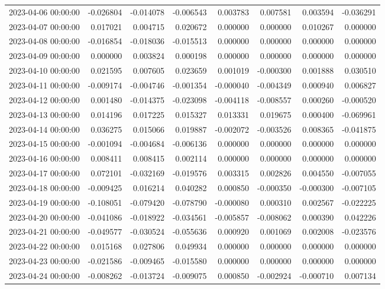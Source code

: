 \begin{tabular}{lrrrrrrr}
2023-04-06 00:00:00 & -0.026804 & -0.014078 & -0.006543 & 0.003783 & 0.007581 & 0.003594 & -0.036291 \\
2023-04-07 00:00:00 & 0.017021 & 0.004715 & 0.020672 & 0.000000 & 0.000000 & 0.010267 & 0.000000 \\
2023-04-08 00:00:00 & -0.016854 & -0.018036 & -0.015513 & 0.000000 & 0.000000 & 0.000000 & 0.000000 \\
2023-04-09 00:00:00 & 0.000000 & 0.003824 & 0.000198 & 0.000000 & 0.000000 & 0.000000 & 0.000000 \\
2023-04-10 00:00:00 & 0.021595 & 0.007605 & 0.023659 & 0.001019 & -0.000300 & 0.001888 & 0.030510 \\
2023-04-11 00:00:00 & -0.009174 & -0.004746 & -0.001354 & -0.000040 & -0.004349 & 0.000940 & 0.006827 \\
2023-04-12 00:00:00 & 0.001480 & -0.014375 & -0.023098 & -0.004118 & -0.008557 & 0.000260 & -0.000520 \\
2023-04-13 00:00:00 & 0.014196 & 0.017225 & 0.015327 & 0.013331 & 0.019675 & 0.000400 & -0.069961 \\
2023-04-14 00:00:00 & 0.036275 & 0.015066 & 0.019887 & -0.002072 & -0.003526 & 0.008365 & -0.041875 \\
2023-04-15 00:00:00 & -0.001094 & -0.004684 & -0.006136 & 0.000000 & 0.000000 & 0.000000 & 0.000000 \\
2023-04-16 00:00:00 & 0.008411 & 0.008415 & 0.002114 & 0.000000 & 0.000000 & 0.000000 & 0.000000 \\
2023-04-17 00:00:00 & 0.072101 & -0.032169 & -0.019576 & 0.003315 & 0.002826 & 0.004550 & -0.007055 \\
2023-04-18 00:00:00 & -0.009425 & 0.016214 & 0.040282 & 0.000850 & -0.000350 & -0.000300 & -0.007105 \\
2023-04-19 00:00:00 & -0.108051 & -0.079420 & -0.078790 & -0.000080 & 0.000310 & 0.002567 & -0.022225 \\
2023-04-20 00:00:00 & -0.041086 & -0.018922 & -0.034561 & -0.005857 & -0.008062 & 0.000390 & 0.042226 \\
2023-04-21 00:00:00 & -0.049577 & -0.030524 & -0.055636 & 0.000920 & 0.001069 & 0.002008 & -0.023576 \\
2023-04-22 00:00:00 & 0.015168 & 0.027806 & 0.049934 & 0.000000 & 0.000000 & 0.000000 & 0.000000 \\
2023-04-23 00:00:00 & -0.021586 & -0.009465 & -0.015580 & 0.000000 & 0.000000 & 0.000000 & 0.000000 \\
2023-04-24 00:00:00 & -0.008262 & -0.013724 & -0.009075 & 0.000850 & -0.002924 & -0.000710 & 0.007134 \\

\end{tabular}
